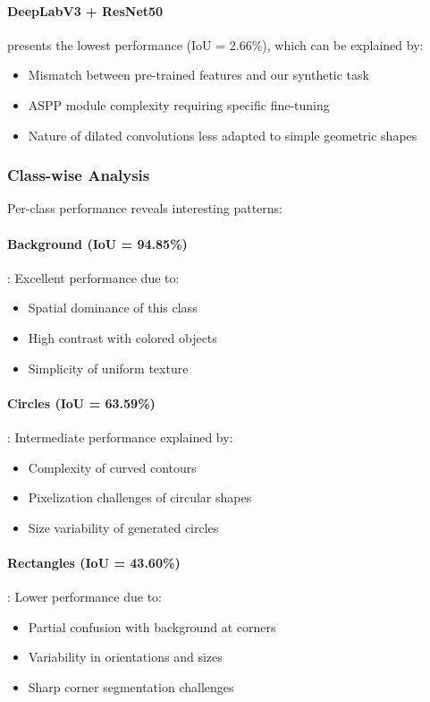 \documentclass[12pt,a4paper]{article}
\begin{document}
\paragraph{DeepLabV3 + ResNet50} presents the lowest performance (IoU = 2.66\%), which can be explained by:
\begin{itemize}
    \item Mismatch between pre-trained features and our synthetic task
    \item ASPP module complexity requiring specific fine-tuning
    \item Nature of dilated convolutions less adapted to simple geometric shapes
\end{itemize}

\subsubsection{Class-wise Analysis}

Per-class performance reveals interesting patterns:

\paragraph{Background (IoU = 94.85\%)}: Excellent performance due to:
\begin{itemize}
    \item Spatial dominance of this class
    \item High contrast with colored objects
    \item Simplicity of uniform texture
\end{itemize}

\paragraph{Circles (IoU = 63.59\%)}: Intermediate performance explained by:
\begin{itemize}
    \item Complexity of curved contours
    \item Pixelization challenges of circular shapes
    \item Size variability of generated circles
\end{itemize}

\paragraph{Rectangles (IoU = 43.60\%)}: Lower performance due to:
\begin{itemize}
    \item Partial confusion with background at corners
    \item Variability in orientations and sizes
    \item Sharp corner segmentation challenges
\end{itemize}
\end{document}
